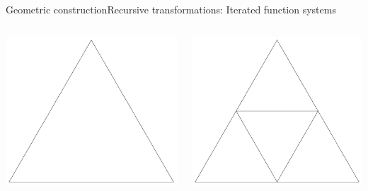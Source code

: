 \documentclass[xcolor=x11names,compress,professionalfonts]{beamer}
\renewcommand{\(}{\begin{columns}}
\renewcommand{\)}{\end{columns}}
\newcommand{\<}[1]{\begin{column}{#1}}
\renewcommand{\>}{\end{column}}
\begin{document}
\begin{frame}{Geometric construction}{Recursive transformations: Iterated function systems}

\begin{columns}
\newcommand{\s}{.2}
  \begin{column}{3cm}
    \includegraphics[scale=\s]{sierpinski0.pdf}
  \end{column}

  \begin{column}{3cm}
     \includegraphics[scale=\s]{sierpinski1.pdf}
  \end{column}
  

\end{columns}
\end{frame}
\end{document}
